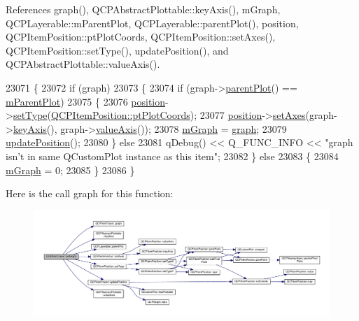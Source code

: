 References graph(), Q\+C\+P\+Abstract\+Plottable\+::key\+Axis(), m\+Graph, Q\+C\+P\+Layerable\+::m\+Parent\+Plot, Q\+C\+P\+Layerable\+::parent\+Plot(), position, Q\+C\+P\+Item\+Position\+::pt\+Plot\+Coords, Q\+C\+P\+Item\+Position\+::set\+Axes(), Q\+C\+P\+Item\+Position\+::set\+Type(), update\+Position(), and Q\+C\+P\+Abstract\+Plottable\+::value\+Axis().


\begin{DoxyCode}
23071 \{
23072   \textcolor{keywordflow}{if} (graph)
23073   \{
23074     \textcolor{keywordflow}{if} (graph->\hyperlink{class_q_c_p_layerable_ab7e0e94461566093d36ffc0f5312b109}{parentPlot}() == \hyperlink{class_q_c_p_layerable_aa2a528433e44db02b8aef23c1f9f90ed}{mParentPlot})
23075     \{
23076       \hyperlink{class_q_c_p_item_tracer_a69917e2fdb2b3a929c196958feee7cbe}{position}->\hyperlink{class_q_c_p_item_position_aa476abf71ed8fa4c537457ebb1a754ad}{setType}(\hyperlink{class_q_c_p_item_position_aad9936c22bf43e3d358552f6e86dbdc8ad5ffb8dc99ad73263f7010c77342294c}{QCPItemPosition::ptPlotCoords});
23077       \hyperlink{class_q_c_p_item_tracer_a69917e2fdb2b3a929c196958feee7cbe}{position}->\hyperlink{class_q_c_p_item_position_a2185f45c75ac8cb9be89daeaaad50e37}{setAxes}(graph->\hyperlink{class_q_c_p_abstract_plottable_a72c7a09c22963f2c943f07112b311103}{keyAxis}(), graph->\hyperlink{class_q_c_p_abstract_plottable_a3106f9d34d330a6097a8ec5905e5b519}{valueAxis}());
23078       \hyperlink{class_q_c_p_item_tracer_a2d70cf616b579563aa15f796dfc143ac}{mGraph} = \hyperlink{class_q_c_p_item_tracer_a74c90da0e6730839b8d7cf6445a4ec1f}{graph};
23079       \hyperlink{class_q_c_p_item_tracer_a5b90296109e36384aedbc8908a670413}{updatePosition}();
23080     \} \textcolor{keywordflow}{else}
23081       qDebug() << Q\_FUNC\_INFO << \textcolor{stringliteral}{"graph isn't in same QCustomPlot instance as this item"};
23082   \} \textcolor{keywordflow}{else}
23083   \{
23084     \hyperlink{class_q_c_p_item_tracer_a2d70cf616b579563aa15f796dfc143ac}{mGraph} = 0;
23085   \}
23086 \}
\end{DoxyCode}


Here is the call graph for this function\+:\nopagebreak
\begin{figure}[H]
\begin{center}
\leavevmode
\includegraphics[width=350pt]{class_q_c_p_item_tracer_af5886f4ded8dd68cb4f3388f390790c0_cgraph}
\end{center}
\end{figure}


